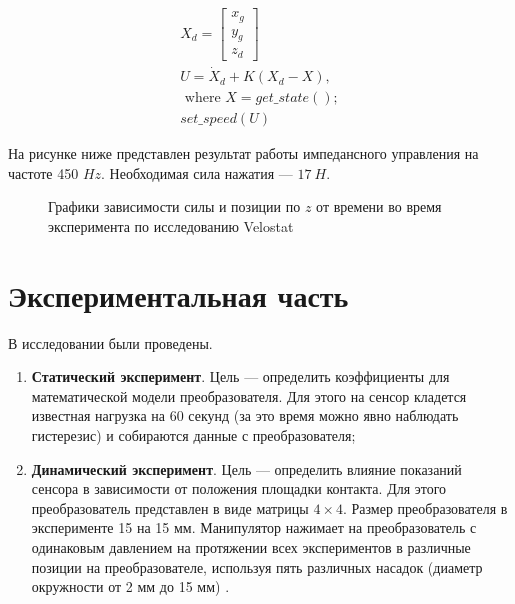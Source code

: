 \begin{align}
    \label{eq:vel_control}
    X_d = \begin{bmatrix}
        x_g \\ y_g \\ z_d
    \end{bmatrix} \\
    U = \dot{X}_d + K(X_d - X), \\ \text{ where } X=get\_state(); \\ 
    set\_speed(U)
\end{align}

На рисунке ниже  представлен результат работы импедансного управления на частоте 450 $Hz$. Необходимая сила нажатия --- $17\ H$.
\begin{figure}[H]
        \centering
        \caption{Графики зависимости силы и позиции по $z$ от времени во время эксперимента по исследованию Velostat}
        \label{fig:force_data_pos.png}
    \end{figure}

\section{Экспериментальная часть}

В исследовании были проведены.
\begin{enumerate}
    \item \textbf{Статический эксперимент}. Цель — определить коэффициенты для математической модели преобразователя. Для этого на сенсор кладется известная нагрузка на 60 секунд (за это время можно явно наблюдать гистерезис) и собираются данные с преобразователя;
          \item\textbf{Динамический эксперимент}. Цель — определить влияние показаний сенсора в зависимости от положения площадки контакта. Для этого преобразователь представлен в виде матрицы $4 \times 4$. Размер преобразователя в эксперименте 15 на 15 мм. Манипулятор нажимает на преобразователь с одинаковым давлением на протяжении всех экспериментов в различные позиции на преобразователе, используя пять различных насадок (диаметр окружности от 2 мм до 15 мм) .
\end{enumerate}


